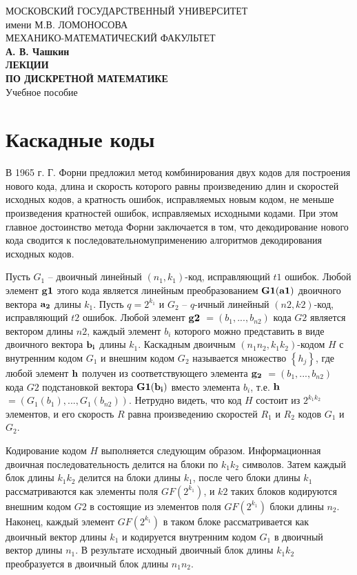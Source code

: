 \documentclass[12pt]{article}
\numberwithin{equation}{section}
\begin{document}
	
\begin{center}
\hfill \break
\large{МОСКОВСКИЙ ГОСУДАРСТВЕННЫЙ УНИВЕРСИТЕТ}\\
\footnotesize{имени М.В. ЛОМОНОСОВА}\\
\footnotesize{МЕХАНИКО-МАТЕМАТИЧЕСКИЙ ФАКУЛЬТЕТ}\\
\hfill \break
\small{\textbf{А. В. Чашкин}}\\
\small{\textbf{ЛЕКЦИИ}}\\
\small{\textbf{ПО ДИСКРЕТНОЙ МАТЕМАТИКЕ}}\\
\hfill \break
\normalsize{Учебное пособие}\
\end{center}
\newpage	
	\tableofcontents
	\newpage

	\section{Каскадные коды}
	
	В 1965 г. Г. Форни предложил метод комбинирования двух кодов для построения нового кода, длина и скорость которого равны произведению длин и скоростей исходных кодов, а кратность ошибок, исправляемых новым кодом, не меньше произведения кратностей ошибок, исправляемых исходными кодами. При этом главное достоинство метода Форни заключается в том, что декодирование нового кода сводится к последовательномуприменению алгоритмов декодирования исходных кодов.
	
	
	Пусть $G_1$ -- двоичный линейный $(n_1, k_1)$-код, исправляющий $t1$ ошибок. Любой элемент $\bf g1$ этого кода является линейным преобразованием $\bf G1(a1)$ двоичного вектора $\bf a_2$ длины $k_1$. Пусть $q = 2^{{k}_{1}}$ и $G_2$ -- $q$-ичный линейный $(n2, k2)$-код, исправляющий $t2$ ошибок. Любой элемент $\bf g2$ $= (b_1,...,b_{n2} )$ кода $G2$ является вектором длины $n2$, каждый элемент $b_i$ которого можно представить в виде двоичного вектора $\bf b_i$ длины $k_1$. Каскадным двоичным
	$(n_1n_2, k_1k_2)$-кодом $H$ с внутренним кодом $G_1$ и внешним кодом $G_2$ называется множество $\left\{{h}_{j}\right\}$, где любой элемент $\bf h$ получен из соответствующего элемента $\bf g_2$ 
	$= (b_1,...,{{b}_{n2}} )$ кода $G2$ подстановкой вектора $\bf G1(b_i)$ вместо элемента $b_i$, т.е. $\bf h$ $= (G_1(b_1),...,G_1({{b}_{n2}} ))$. Нетрудно видеть, что код $H$ состоит из $2^{k_1k_2}$ элементов, и его скорость $R$ равна произведению скоростей $R_1$ и $R_2$ кодов $G_1$ и $G_2$.
	
	Кодирование кодом
	$H$ выполняется следующим образом. Информационная двоичная последовательность делится на блоки по $k_1k_2$ символов. Затем каждый блок длины $k_1k_2$ делится на блоки длины $k_1$, после чего блоки
	длины $k_1$ рассматриваются как элементы поля $GF(2^{{k}_{1}})$, и $k2$ таких блоков кодируются внешним кодом
	$G2$ в состоящие из элементов поля $GF(2^{{k}_{1}})$
	блоки длины
	$n_2$. Наконец, каждый элемент $GF(2^{{k}_{1}})$ в таком блоке рассматривается как двоичный вектор длины $k_1$ и кодируется внутренним кодом $G_1$ в двоичный вектор длины
	$n_1$. В результате исходный двоичный блок
	длины $k_1k_2$ преобразуется в двоичный блок длины $n_1n_2$.
	
\end{document}
